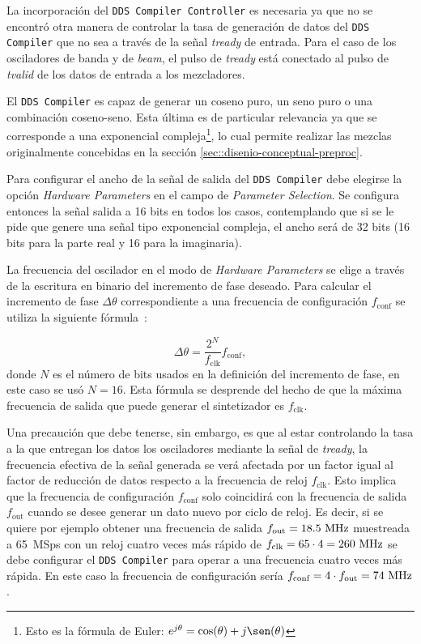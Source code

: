 \documentclass[../../main.tex]{subfiles}
\begin{document}
La incorporación del \texttt{DDS Compiler Controller} es necesaria ya que no se encontró otra manera de controlar la tasa de generación de datos del \texttt{DDS Compiler} que no sea a través de la señal \textit{tready} de entrada. Para el caso de los osciladores de banda y de \textit{beam}, el pulso de \textit{tready} está conectado al pulso de \textit{tvalid} de los datos de entrada a los mezcladores.

El \texttt{DDS Compiler} es capaz de generar un coseno puro, un seno puro o una combinación coseno-seno. Esta última es de particular relevancia ya que se corresponde a una exponencial compleja\footnote{Esto es la fórmula de Euler: $e^{j \theta} = \cos(\theta) + j\sen(\theta)$}, lo cual permite realizar las mezclas originalmente concebidas en la sección \ref{sec::disenio-conceptual-preproc}.

Para configurar el ancho de la señal de salida del \texttt{DDS Compiler} debe elegirse la opción \textit{Hardware Parameters} en el campo de \textit{Parameter Selection}. Se configura entonces la señal salida a 16 bits en todos los casos, contemplando que si se le pide que genere una señal tipo exponencial compleja, el ancho será de 32 bits (16 bits para la parte real y 16 para la imaginaria).

La frecuencia del oscilador en el modo de \textit{Hardware Parameters} se elige a través de la escritura en binario del incremento de fase deseado. Para calcular el incremento de fase $\Delta \theta$ correspondiente a una frecuencia de configuración $f_\textrm{conf}$ se utiliza la siguiente fórmula~\cite[p. 17]{dds-compiler}:

\begin{equation}
     \Delta \theta = \frac{2^N}{f_\textrm{clk}} f_\textrm{conf},
     \label{eq::calculo-incremento-fase}
\end{equation}
donde $N$ es el número de bits usados en la definición del incremento de fase, en este caso se usó $N = 16$. Esta fórmula se desprende del hecho de que la máxima frecuencia de salida que puede generar el sintetizador es $f_\textrm{clk}$.

Una precaución que debe tenerse, sin embargo, es que al estar controlando la tasa a la que entregan los datos los osciladores mediante la señal de \textit{tready}, la frecuencia efectiva de la señal generada se verá afectada por un factor igual al factor de reducción de datos respecto a la frecuencia de reloj $f_\textrm{clk}$. 
Esto implica que la frecuencia de configuración $f_\textrm{conf}$ solo coincidirá con la frecuencia de salida $f_\textrm{out}$ cuando se desee generar un dato nuevo por ciclo de reloj. 
Es decir, si se quiere por ejemplo obtener una frecuencia de salida $f_\textrm{out} = 18.5~\textrm{MHz}$ muestreada a 65~MSps con un reloj cuatro veces más rápido de $f_\textrm{clk} = 65 \cdot 4 = 260~\textrm{MHz}$ se debe configurar el \texttt{DDS Compiler} para operar a una frecuencia cuatro veces más rápida. En este caso la frecuencia de configuración sería $f_\textrm{conf} = 4 \cdot f_\textrm{out} = 74~\textrm{MHz}$.
\end{document}
